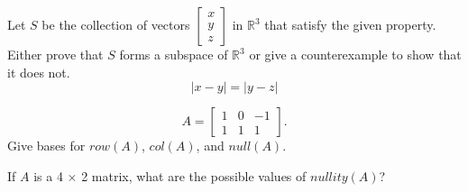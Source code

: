 \documentclass[11pt,letterpaper,boxed]{hmcpset}
\begin{document}


\begin{problem}[3.5 \#8]
    Let $S$ be the collection of vectors $\begin{bmatrix} x\\ y\\ z\end{bmatrix}$ in $\mathbb{R}^3$ that satisfy the given property. Either prove that $S$ forms a subspace of $\mathbb{R}^3$ or give a counterexample to show that it does not.
    \[
    |x-y|=|y-z|
    \]
\end{problem}

\begin{solution}
    \vfill
\end{solution}

\newpage


\begin{problem}[3.5 \#17]
    \[A = 
    \begin{bmatrix}
    1& 0& -1 \\
    1& 1&  1
    \end{bmatrix}.
    \]
    Give bases for $row(A)$, $col(A)$, and $null(A)$.
\end{problem}

\begin{solution}
    \vfill
\end{solution}

\newpage


\begin{problem}[3.5 \#42]
    If $A$ is a 4 $\times$ 2 matrix, what are the possible values of $nullity(A)$?
\end{problem}

\begin{solution}
    \vfill
\end{solution}

\newpage

\end{document}
